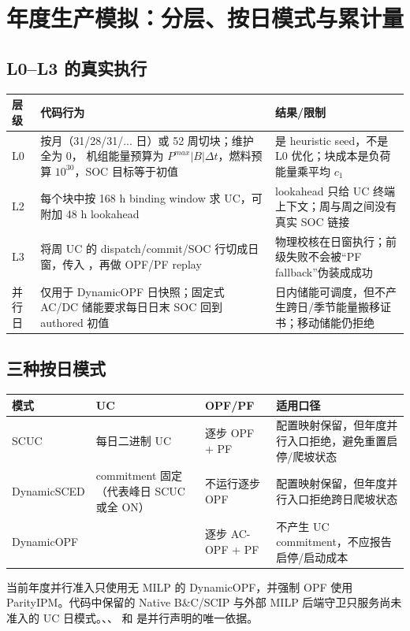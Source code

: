 \section{年度生产模拟：分层、按日模式与累计量}
\label{sec:annual}

\subsection{L0--L3 的真实执行}
\begin{longtable}{@{}L{2.0cm}L{5.0cm}L{5.4cm}@{}}
\toprule
层级 & 代码行为 & 结果/限制\\ \midrule
L0 &  按月（31/28/31/... 日）或 52 周切块；维护全为 0，
机组能量预算为 $P^{max}|B|\Delta t$，燃料预算 $10^{30}$，SOC 目标等于初值 & 是 heuristic seed，不是 L0 优化；块成本是负荷能量乘平均 $c_1$\\
L2 & 每个块中按 168 h binding window 求 UC，可附加 48 h lookahead & lookahead 只给 UC 终端上下文；周与周之间没有真实 SOC 链接\\
L3 & 将周 UC 的 dispatch/commit/SOC 行切成日窗，传入 ，再做 OPF/PF replay & 物理校核在日窗执行；前级失败不会被“PF fallback”伪装成成功\\
并行日 & 仅用于 DynamicOPF 日快照；固定式 AC/DC 储能要求每日日末 SOC 回到 authored 初值 & 日内储能可调度，但不产生跨日/季节能量搬移证书；移动储能仍拒绝\\
\bottomrule
\end{longtable}

\subsection{三种按日模式}
\begin{center}\footnotesize
\begin{tabular}{@{}L{3.0cm}L{3.0cm}L{3.0cm}L{5.1cm}@{}}
\toprule
模式 & UC & OPF/PF & 适用口径\\ \midrule
SCUC & 每日二进制 UC & 逐步 OPF + PF & 配置映射保留，但年度并行入口拒绝，避免重置启停/爬坡状态\\
DynamicSCED & commitment 固定（代表峰日 SCUC 或全 ON） & 不运行逐步 OPF & 配置映射保留，但年度并行入口拒绝跨日爬坡状态\\
DynamicOPF &  & 逐步 AC-OPF + PF & 不产生 UC commitment，不应报告启停/启动成本\\
\bottomrule
\end{tabular}
\end{center}
当前年度并行准入只使用无 MILP 的 DynamicOPF，并强制 OPF 使用 ParityIPM。代码中保留的
Native B\&C/SCIP 与外部 MILP 后端守卫只服务尚未准入的 UC 日模式。、、
 和  是并行声明的唯一依据。

